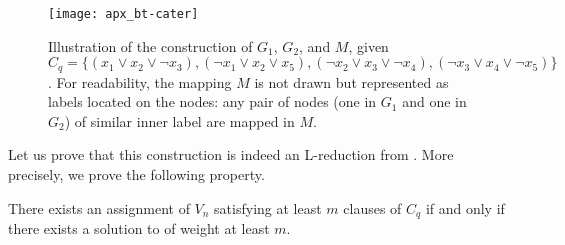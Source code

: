 		\begin{figure}[ht]
    	 	 \centering
    	 	 \texttt{[image: apx\_bt-cater]}
    	 	 \caption{Illustration of the construction of $G_1$, $G_2$, and $M$, given $C_q = \{(x_1 \vee x_2 \vee \neg{}x_3), (\neg{}x_1 \vee x_2 \vee x_5), (\neg{}x_2 \vee x_3 \vee \neg{}x_4), (\neg{}x_3 \vee x_4 \vee \neg{}x_5)\}$. For readability, the mapping $M$ is not drawn but represented as labels located on the nodes: any pair of nodes (one in $G_1$ and one in $G_2$) of similar inner label are mapped in $M$.}
			\label{fig:bt-cater}
		\end{figure}

		Let us prove that this construction is indeed an L-reduction from \msat{}. More precisely, we prove the following property.
		\begin{lemma}
		There exists an assignment of $V_n$ satisfying at least $m$ clauses of $C_q$ if and only if there exists a solution to \mwccs{} of weight at least $m$.
		\end{lemma}

